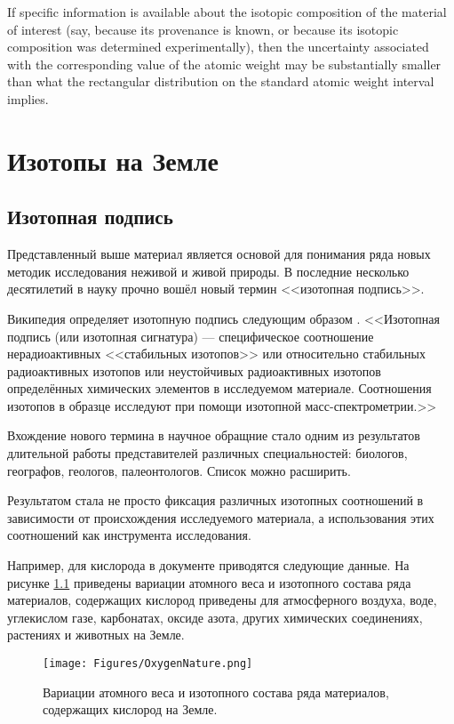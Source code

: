 \documentclass[a5paper,openany]{book}
\begin{document}
If specific information is available about the isotopic composition of the material of interest (say, because
its provenance is known, or because its isotopic composition was determined experimentally), then the
uncertainty associated with the corresponding value of the atomic weight may be substantially smaller than
what the rectangular distribution on the standard atomic weight interval implies.

\chapter{Изотопы на Земле}\label{s:IsotopesEarth}


\section{Изотопная подпись}\label{s:IsotopeSignature}

Представленный выше материал является основой для понимания ряда новых методик исследования неживой и живой природы. 
В последние несколько десятилетий в науку прочно вошёл новый термин <<изотопная подпись>>. 

Википедия определяет изотопную подпись следующим образом \cite{IsotopeSignatureWiki}. 
<<Изотопная подпись  (или изотопная сигнатура) --- специфическое соотношение нерадиоактивных <<стабильных изотопов>> или относительно стабильных радиоактивных изотопов или неустойчивых радиоактивных изотопов определённых химических элементов в исследуемом материале. Соотношения изотопов в образце исследуют при помощи изотопной масс-спектрометрии.>>

Вхождение нового термина в научное обращние стало одним из результатов длительной работы представителей различных специальностей: биологов, географов, геологов, палеонтологов. Список можно расширить.

Результатом стала не просто фиксация различных изотопных соотношений в зависимости от происхождения исследуемого материала, а использования этих соотношений как инструмента исследования.

Например, для кислорода в документе \cite{IUPAC2018} приводятся следующие данные.
На рисунке \ref{f:OxygenNature} приведены вариации атомного веса и изотопного состава ряда материалов, содержащих кислород приведены для атмосферного воздуха, воде, углекислом газе, карбонатах, оксиде азота, других химических соединениях, растениях и животных на Земле. 

\begin{figure}[ht] 
	\centering\small
	\unitlength=1mm
	\texttt{[image: Figures/OxygenNature.png]} 
	\caption{Вариации атомного веса и изотопного состава ряда материалов, содержащих кислород \cite{IUPAC2018} на Земле.} 
	\label{f:OxygenNature}
\end{figure}
\end{document}
